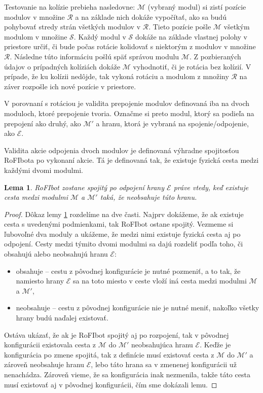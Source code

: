 \documentclass[
  printed, %
  oneside, %
  notable,   %
  nolof,     %
  nolot,     %
]{fithesis3}
\newtheorem{lemma}{Lema}
\begin{document}
Testovanie na kolízie prebieha nasledovne: $\mathcal{M}$ (vybraný modul) si zistí pozície modulov v množine $\mathcal{R}$ a na základe nich dokáže vypočítať, ako sa budú pohybovať stredy strán všetkých modulov v $\mathcal{R}$. Tieto pozície pošle $\mathcal{M}$ všetkým modulom v množine $\mathcal{S}$. Každý modul v $\mathcal{S}$ dokáže na základe vlastnej polohy v priestore určiť, či bude počas rotácie kolidovať s niektorým z modulov v množine $\mathcal{R}$. Následne túto informáciu pošlú späť správou modulu $\mathcal{M}$. Z pozbieraných údajov o prípadných kolíziách dokáže $\mathcal{M}$ vyhodnotiť, či je rotácia bez kolízií. V prípade, že ku kolízii nedôjde, tak vykoná rotáciu a modulom z množiny $\mathcal{R}$ na záver rozpošle ich nové pozície v priestore. 

V porovnaní s rotáciou je validita prepojenie modulov definovaná iba na dvoch moduloch, ktoré prepojenie tvoria. Označme si preto modul, ktorý sa podieľa na prepojení ako druhý, ako $\mathcal{M}'$ a hranu, ktorá je vybraná na spojenie/odpojenie, ako $\mathcal{E}$. 

Validita akcie odpojenia dvoch modulov je definovaná výhradne spojitosťou RoFIbota po vykonaní akcie. Tá je definovaná tak, že existuje fyzická cesta medzi každými dvomi modulmi. 

\begin{lemma}
\label{lemma:disconnection}
RoFIbot zostane spojitý po odpojení hrany $\mathcal{E}$ práve vtedy, keď existuje cesta medzi modulmi $\mathcal{M}$ a $\mathcal{M}'$ taká, že neobsahuje túto hranu. 
\end{lemma}

\begin{proof}
Dôkaz lemy \ref{lemma:disconnection} rozdelíme na dve časti. Najprv dokážeme, že ak existuje cesta s uvedenými podmienkami, tak RoFIbot ostane spojitý. Vezmeme si ľubovoľné dva moduly a ukážeme, že medzi nimi existuje fyzická cesta aj po odpojení. Cesty medzi týmito dvomi modulmi sa dajú rozdeliť podľa toho, či obsahujú alebo neobsahujú hranu $\mathcal{E}$: 
\begin{itemize}
    \item obsahuje -- cestu z pôvodnej konfigurácie je nutné pozmeniť, a to tak, že namiesto hrany $\mathcal{E}$ sa na toto miesto v ceste vloží iná cesta medzi modulmi $\mathcal{M}$ a $\mathcal{M}'$, 
    \item neobsahuje -- cestu z pôvodnej konfigurácie nie je nutné meniť, nakoľko všetky hrany budú naďalej existovať.
\end{itemize}

Ostáva ukázať, že ak je RoFIbot spojitý aj po rozpojení, tak v pôvodnej konfigurácii existovala cesta z $\mathcal{M}$ do $\mathcal{M}'$ neobsahujúca hranu $\mathcal{E}$. Keďže je konfigurácia po zmene spojitá, tak z definície musí existovať cesta z $\mathcal{M}$ do $\mathcal{M}'$ a zároveň neobsahuje hranu $\mathcal{E}$, lebo táto hrana sa v zmenenej konfigurácii už nenachádza. Zároveň vieme, že sa konfigurácia inak nezmenila, takže táto cesta musí existovať aj v pôvodnej konfigurácii, čím sme dokázali lemu. 

\end{proof}
\end{document}
